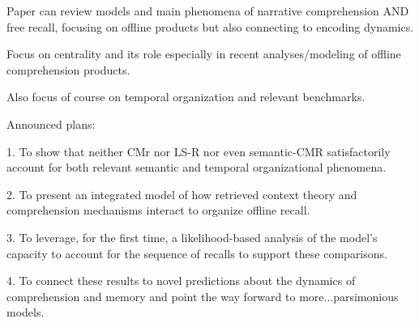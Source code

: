 Paper can review models and main phenomena of narrative comprehension AND free recall, focusing on offline products but also connecting to encoding dynamics.

Focus on centrality and its role especially in recent analyses/modeling of offline comprehension products.

Also focus of course on temporal organization and relevant benchmarks.

Announced plans:

1. To show that neither CMr nor LS-R nor even semantic-CMR satisfactorily account for both relevant semantic and temporal organizational phenomena. 

2. To present an integrated model of how retrieved context theory and comprehension mechanisms interact to organize offline recall.

3. To leverage, for the first time, a likelihood-based analysis of the model's capacity to account for the sequence of recalls to support these comparisons.

4. To connect these results to novel predictions about the dynamics of comprehension and memory and point the way forward to more...parsimonious models.